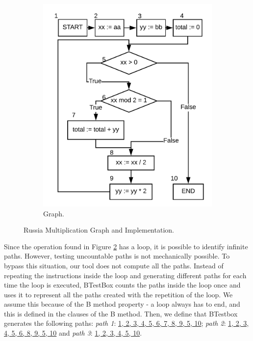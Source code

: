 \documentclass[runningheads]{llncs}
\begin{document}
\begin{figure}
\begin{minipage}{0.45\textwidth}
\begin{subfigure}{\textwidth}
\includegraphics[width = \textwidth]{imagens/lacoGrafo.png}
\caption{Graph.}
\label{fig:russianMultGraph}
\end{subfigure}
\end{minipage}
\caption{Russia Multiplication Graph and Implementation.}
\end{figure}

Since the operation found in Figure \ref{fig:russianMultGraph} has a loop, it is possible to identify infinite paths. However, testing uncountable paths is not mechanically possible.
To bypass this situation, our tool does not compute all the paths. Instead of repeating the instructions inside the loop and generating different paths for each time the loop is executed, BTestBox counts the paths inside the loop once and uses it to represent all the paths created with the repetition of the loop. We assume this because of the B method property - a loop always has to end, and this is defined in the clauses of the B method. Then, we define that BTestbox generates the following paths: \textit{path 1}: \ul{1, 2, 3, 4, 5, 6, 7, 8, 9, 5, 10};  \textit{path 2}: \ul{1, 2, 3, 4, 5, 6, 8, 9, 5, 10} and \textit{path 3}: \ul{1, 2, 3, 4, 5, 10}.
\end{document}
